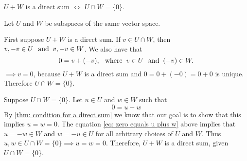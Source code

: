 \setcounter{thm}{45}
\begin{thm} 
  \label{thm: sum and intersection of two subspaces}
  $U+W$ is a direct sum $\iff$ $U \cap W = \{0\}$.
\end{thm}
\begin{prf} Let $U$ and $W$ be subspaces of the same vector space.
  \begin{description}
    \item{} First suppose $U+W$ is a direct sum. If $v \in U \cap W$, then $v, -v \in U \;\;\, \text{and}\;\; v, -v \in W$. We also have that
    \begin{equation}
      0 = v + (-v), \;\;\, \text{where}\;\; v\in U \;\;\, \text{and}\;\; (-v) \in W.
    \end{equation}
    $\implies v=0$, because $U+W$  is a direct sum and $0 = 0+(-0)=0+0$ is unique. Therefore $U \cap W = \{0\}$.

    \item{} Suppose $U\cap W = \{0\}$. Let  $u\in U$ and $w \in W$ such that
    \begin{equation}
      \label{eq: zero equals u plus w}
      0 = u+w
    \end{equation}
    By \ref{thm: condition for a direct sum} we know that our goal is to show that this implies $u=w=0$. The equation \eqref{eq: zero equals u plus w} above implies that $u=-w\in W$  and $w=-u \in U$ for all arbitrary choices of $U$ and $W$. Thus $u,w \in U\cap W = \{0\} \implies u=w=0.$ Therefore, $U+W$ is a direct sum, given $U \cap W = \{0\}$.
  \end{description}
  \vspace{-1em}
\end{prf}
